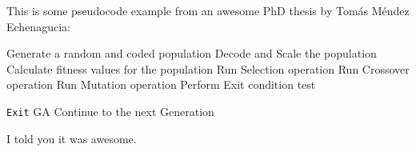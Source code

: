  This is some pseudocode example from an awesome PhD thesis by Tom\'{a}s
 M\'{e}ndez Echenagucia:\\
 
 \begin{algorithmic}[1]
\State Generate a random and coded population 
    \State Decode and Scale the population
    \State Calculate fitness values for the population
    \State Run Selection operation
    \State Run Crossover operation
    \State Run Mutation operation
    \State Perform Exit condition test
    
        \State \texttt{Exit} GA
        \State Continue to the next Generation
    \EndIf
\EndFor
\end{algorithmic}




I told you it was awesome. 
